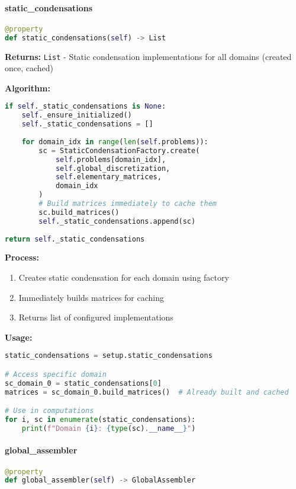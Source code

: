 \paragraph{static\_condensations}
\begin{lstlisting}[language=Python, caption=Static Condensations Property]
@property
def static_condensations(self) -> List
\end{lstlisting}

\textbf{Returns:} \texttt{List} - Static condensation implementations for all domains (created once, cached)

\textbf{Algorithm:}
\begin{lstlisting}[language=Python, caption=Static Condensations Implementation]
if self._static_condensations is None:
    self._ensure_initialized()
    self._static_condensations = []
    
    for domain_idx in range(len(self.problems)):
        sc = StaticCondensationFactory.create(
            self.problems[domain_idx],
            self.global_discretization,
            self.elementary_matrices,
            domain_idx
        )
        # Build matrices immediately to cache them
        sc.build_matrices()
        self._static_condensations.append(sc)
        
return self._static_condensations
\end{lstlisting}

\textbf{Process:}
\begin{enumerate}
    \item Creates static condensation for each domain using factory
    \item Immediately builds matrices for caching
    \item Returns list of configured implementations
\end{enumerate}

\textbf{Usage:}
\begin{lstlisting}[language=Python, caption=Static Condensations Usage]
static_condensations = setup.static_condensations

# Access specific domain
sc_domain_0 = static_condensations[0]
matrices = sc_domain_0.build_matrices()  # Already built and cached

# Use in computations
for i, sc in enumerate(static_condensations):
    print(f"Domain {i}: {type(sc).__name__}")
\end{lstlisting}

\paragraph{global\_assembler}
\begin{lstlisting}[language=Python, caption=Global Assembler Property]
@property
def global_assembler(self) -> GlobalAssembler
\end{lstlisting}

